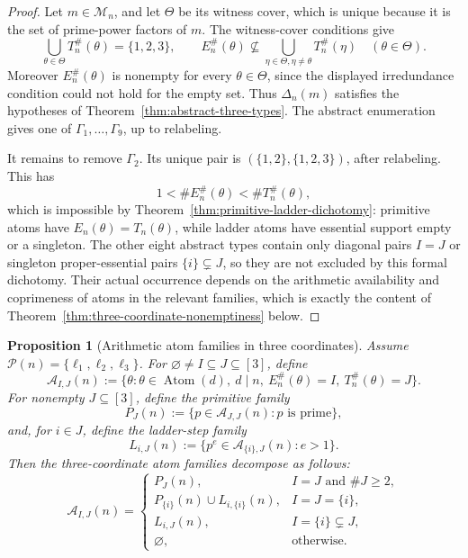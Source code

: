 \documentclass[11pt,letterpaper]{article}
\numberwithin{equation}{section}
\theoremstyle{plain}
\newtheorem{proposition}[theorem]{Proposition}
\theoremstyle{definition}
\theoremstyle{remark}
\DeclareMathOperator{\Atom}{Atom}
\begin{document}
\begin{proof}
Let \(m\in\mathcal M_n\), and let \(\Theta\) be its witness cover, which is
unique because it is the set of prime-power factors of \(m\). The witness-cover
conditions give
\[
\bigcup_{\theta\in\Theta}T_n^\#(\theta)=\{1,2,3\},\qquad
E_n^\#(\theta)\nsubseteq
 \bigcup_{\eta\in\Theta,\eta\ne\theta}T_n^\#(\eta)
 \quad(\theta\in\Theta).
\]
Moreover \(E_n^\#(\theta)\) is nonempty for every \(\theta\in\Theta\), since
the displayed irredundance condition could not hold for the empty set. Thus
\(\Delta_n(m)\) satisfies the hypotheses of
Theorem~\ref{thm:abstract-three-types}. The abstract enumeration gives one of
\(\Gamma_1,\ldots,\Gamma_9\), up to relabeling.

It remains to remove \(\Gamma_2\). Its unique pair is
\((\{1,2\},\{1,2,3\})\), after relabeling. This has
\[
1<\#E_n^\#(\theta)<\#T_n^\#(\theta),
\]
which is impossible by Theorem~\ref{thm:primitive-ladder-dichotomy}: primitive
atoms have \(E_n(\theta)=T_n(\theta)\), while ladder atoms have essential
support empty or a singleton. The other eight abstract types contain only
diagonal pairs \(I=J\) or singleton proper-essential pairs
\(\{i\}\subsetneq J\), so they are not excluded by this formal dichotomy.
Their actual occurrence depends on the arithmetic availability and coprimeness
of atoms in the relevant families, which is exactly the content of
Theorem~\ref{thm:three-coordinate-nonemptiness} below.
\end{proof}

\begin{proposition}[Arithmetic atom families in three coordinates]
\label{prop:three-coordinate-atom-families}
Assume \(\mathcal P(n)=\{\ell_1,\ell_2,\ell_3\}\). For
\(\varnothing\ne I\subseteq J\subseteq[3]\), define
\[
\mathcal A_{I,J}(n):=
\{\theta:\theta\in\Atom(d),\ d\mid n,\ E_n^\#(\theta)=I,\
T_n^\#(\theta)=J\}.
\]
For nonempty \(J\subseteq[3]\), define the primitive family
\[
P_J(n):=\{p\in\mathcal A_{J,J}(n):p\text{ is prime}\},
\]
and, for \(i\in J\), define the ladder-step family
\[
L_{i,J}(n):=
\{p^e\in\mathcal A_{\{i\},J}(n):e>1\}.
\]
Then the three-coordinate atom families decompose as follows:
\[
\mathcal A_{I,J}(n)=
\begin{cases}
P_J(n),& I=J\text{ and }\#J\ge2,\\
P_{\{i\}}(n)\cup L_{i,\{i\}}(n),& I=J=\{i\},\\
L_{i,J}(n),& I=\{i\}\subsetneq J,\\
\varnothing,&\text{otherwise}.
\end{cases}
\]
\end{proposition}
\end{document}
